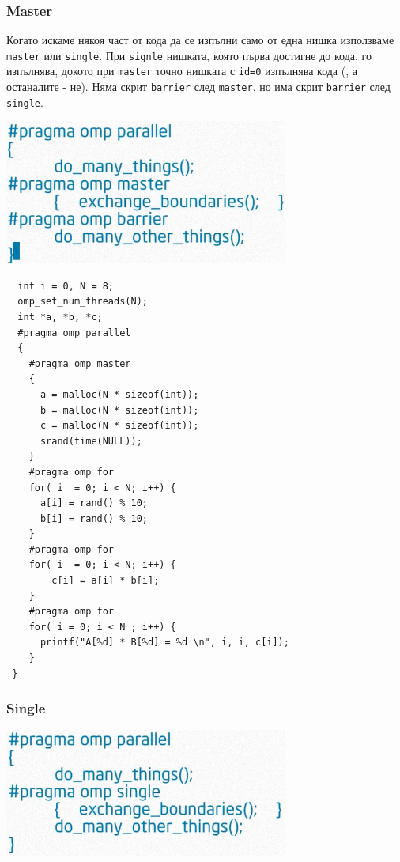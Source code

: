 \documentclass{beamer}
\begin{document}
\begin{frame}
  \frametitle{Master}

  Когато искаме някоя част от кода да се изпълни само от една нишка използваме \texttt{master} или \texttt{single}. При \texttt{signle} нишката, която първа достигне до кода, го изпълнява, докото при \texttt{master} точно нишката с \texttt{id=0} изпълнява кода (, а останалите - не). Няма скрит \texttt{barrier} след \texttt{master}, но има скрит \texttt{barrier} след \texttt{single}.

  \centering
  \includegraphics[width=0.7\textwidth]{master}
\end{frame}


\begin{frame}
 \scriptsize
\lstset{language=C++}
\begin{lstlisting}
  int i = 0, N = 8;
  omp_set_num_threads(N);
  int *a, *b, *c;
  #pragma omp parallel
  {
    #pragma omp master
    {
      a = malloc(N * sizeof(int));
      b = malloc(N * sizeof(int));
      c = malloc(N * sizeof(int));
      srand(time(NULL));
    }
    #pragma omp for
    for( i  = 0; i < N; i++) {
      a[i] = rand() % 10;  
      b[i] = rand() % 10;
    }
    #pragma omp for
    for( i  = 0; i < N; i++) {
        c[i] = a[i] * b[i];
    }
    #pragma omp for
    for( i = 0; i < N ; i++) {
      printf("A[%d] * B[%d] = %d \n", i, i, c[i]);
    }
 }
\end{lstlisting}
\end{frame}


\begin{frame}
  \frametitle{Single}
  \centering
  \includegraphics[width=0.7\textwidth]{single}
\end{frame}
\end{document}
